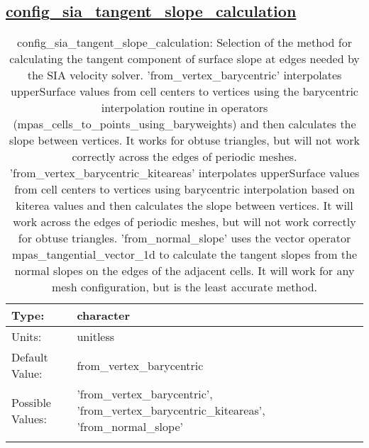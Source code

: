 \subsection[config\_sia\_tangent\_slope\_calculation]{\hyperref[sec:nm_tab_velocity_solver]{config\_sia\_tangent\_slope\_calculation}}
\label{subsec:nm_sec_config_sia_tangent_slope_calculation}
\begin{center}
\begin{longtable}{| p{2.0in} || p{4.0in} |}
    \hline
    Type: & character \\
    \hline
    Units: & \si{unitless} \\
    \hline
    Default Value: & from\_vertex\_barycentric \\
    \hline
    Possible Values: & 'from\_vertex\_barycentric', 'from\_vertex\_barycentric\_kiteareas', 'from\_normal\_slope' \\
    \hline
    \caption{config\_sia\_tangent\_slope\_calculation: Selection of the method for calculating the tangent component of surface slope at edges needed by the SIA velocity solver. 'from\_vertex\_barycentric' interpolates upperSurface values from cell centers to vertices using the barycentric interpolation routine in operators (mpas\_cells\_to\_points\_using\_baryweights) and then calculates the slope between vertices.  It works for obtuse triangles, but will not work correctly across the edges of periodic meshes. 'from\_vertex\_barycentric\_kiteareas' interpolates upperSurface values from cell centers to vertices using barycentric interpolation based on kiterea values and then calculates the slope between vertices.  It will work across the edges of periodic meshes, but will not work correctly for obtuse triangles. 'from\_normal\_slope' uses the vector operator mpas\_tangential\_vector\_1d to calculate the tangent slopes from the normal slopes on the edges of the adjacent cells.  It will work for any mesh configuration, but is the least accurate method.}
\end{longtable}
\end{center}
